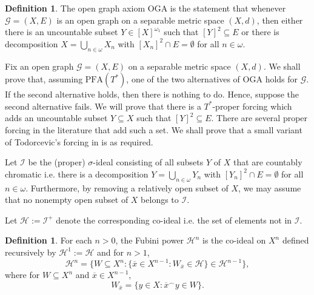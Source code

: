 \documentclass{amsart}
\theoremstyle{definition}
\newtheorem{definition}[theorem]{Definition}
\newcommand{\al}{\omega_1}
\newcommand{\PFA}{\mathrm{PFA}}
\newcommand{\OGA}{\mathrm{OGA}}
\begin{document}
\begin{definition}
    The open graph axiom $\OGA$ is the statement that whenever $\mathcal{G} = (X, E)$ is an open graph on a separable metric space $(X,d)$, then either there is an uncountable subset $Y\in[X]^{\al}$ such that $[Y]^2\subseteq E$ or there is  decomposition $X=\bigcup_{n\in\omega}X_n$ with $[X_n]^2\cap E=\emptyset$ for all $n\in\omega$.

\end{definition}

Fix an open graph  $\mathcal{G} = (X, E)$ on a separable metric space $(X,d)$. We shall prove that, assuming $\PFA(T^*)$, one of the two alternatives of $\OGA$ holds for $\mathcal{G}$. If the second alternative holds, then there is nothing to do. Hence, suppose the second alternative fails. We will prove that there is a $T^*$-proper forcing which adds an uncountable subset $Y\subseteq X$ such that $[Y]^2\subseteq E$. There are several proper forcing in the literature that add such a set. We shall prove that a small variant of Todorcevic's forcing in \cite{Todorcevic2011} is as required.

Let $\mathcal{I}$ be the (proper) $\sigma$-ideal consisting of all subsets $Y$ of $X$ that are countably chromatic i.e. there is a decomposition $Y=\bigcup_{n\in\omega}Y_n$ with $[Y_n]^2\cap E=\emptyset$ for all $n\in\omega$. Furthermore, by removing a relatively open subset of $X$, we may assume that no nonempty  open subset of $X$ belongs to $\mathcal I$.

Let $\mathcal{H}:=\mathcal{I}^+$ denote the corresponding co-ideal i.e. the set of elements not in $\mathcal{I}$.
\begin{definition}
    For each $n>0$, the Fubini power $\mathcal{H}^n$ is the co-ideal on $X^n$ defined recursively by $\mathcal{H}^1:= \mathcal{H}$ and for $n > 1$,
$$\mathcal{H}^n=\{W \subseteq X^n :\{\overline{x} \in X^{n-1} :W_{\overline{x}}\in \mathcal{H}\}\in \mathcal{H}^{n-1}\},$$ where for $W \subseteq X^n$ and $\overline{x} \in X^{n-1}$,
$$W_{\overline{x}}= \{ y \in X : \overline{x}^\frown y \in W \}.$$
\end{definition}
\end{document}
